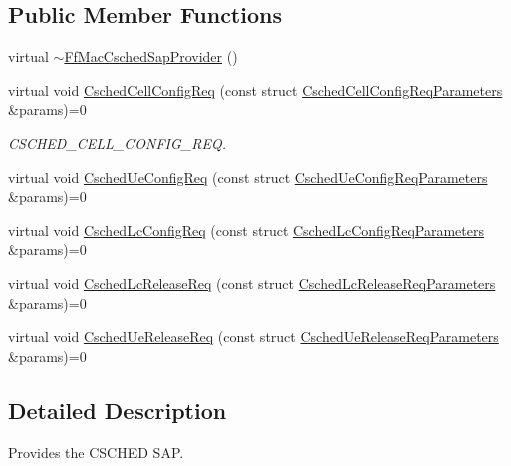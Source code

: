 \subsection*{Public Member Functions}
\begin{DoxyCompactItemize}
\item 
virtual \hyperlink{classns3_1_1FfMacCschedSapProvider_a3c7d97b1f057f906e530d1c04b22905e}{$\sim$\+Ff\+Mac\+Csched\+Sap\+Provider} ()
\item 
virtual void \hyperlink{classns3_1_1FfMacCschedSapProvider_a589b513d02cee1952db7068372fba948}{Csched\+Cell\+Config\+Req} (const struct \hyperlink{structns3_1_1FfMacCschedSapProvider_1_1CschedCellConfigReqParameters}{Csched\+Cell\+Config\+Req\+Parameters} \&params)=0
\begin{DoxyCompactList}\small\item\em C\+S\+C\+H\+E\+D\+\_\+\+C\+E\+L\+L\+\_\+\+C\+O\+N\+F\+I\+G\+\_\+\+R\+EQ. \end{DoxyCompactList}\item 
virtual void \hyperlink{classns3_1_1FfMacCschedSapProvider_a104a8ccff3678bcd34548ea574c380dd}{Csched\+Ue\+Config\+Req} (const struct \hyperlink{structns3_1_1FfMacCschedSapProvider_1_1CschedUeConfigReqParameters}{Csched\+Ue\+Config\+Req\+Parameters} \&params)=0
\item 
virtual void \hyperlink{classns3_1_1FfMacCschedSapProvider_ad80e0e37f90887055ac79ccad7d2ba2f}{Csched\+Lc\+Config\+Req} (const struct \hyperlink{structns3_1_1FfMacCschedSapProvider_1_1CschedLcConfigReqParameters}{Csched\+Lc\+Config\+Req\+Parameters} \&params)=0
\item 
virtual void \hyperlink{classns3_1_1FfMacCschedSapProvider_aebd56fe603cabe3faf225338bf980f23}{Csched\+Lc\+Release\+Req} (const struct \hyperlink{structns3_1_1FfMacCschedSapProvider_1_1CschedLcReleaseReqParameters}{Csched\+Lc\+Release\+Req\+Parameters} \&params)=0
\item 
virtual void \hyperlink{classns3_1_1FfMacCschedSapProvider_a225386b43e6e3acbb630084f9c49e329}{Csched\+Ue\+Release\+Req} (const struct \hyperlink{structns3_1_1FfMacCschedSapProvider_1_1CschedUeReleaseReqParameters}{Csched\+Ue\+Release\+Req\+Parameters} \&params)=0
\end{DoxyCompactItemize}


\subsection{Detailed Description}
Provides the C\+S\+C\+H\+ED S\+AP. 

